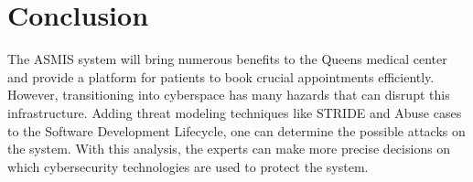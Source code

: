 \chapter{Conclusion}
The ASMIS system will bring numerous benefits to the Queens medical center and provide a platform for patients to book crucial appointments efficiently. However, transitioning into cyberspace has many hazards that can disrupt this infrastructure. Adding threat modeling techniques like STRIDE and Abuse cases to the Software Development Lifecycle, one can determine the possible attacks on the system. With this analysis, the experts can make more precise decisions on which cybersecurity technologies are used to protect the system.